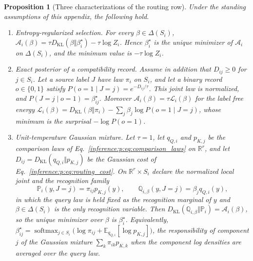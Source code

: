 \documentclass[11pt]{article}
\newtheorem{proposition}[theorem]{Proposition}
\theoremstyle{definition}
\theoremstyle{remark}
\providecommand{\KL}{D_{\mathrm{KL}}}
\providecommand{\softmax}{\operatorname{softmax}}
\providecommand{\E}{\mathbb{E}}
\providecommand{\R}{\mathbb{R}}
\begin{document}
\begin{proposition}[Three characterizations of the routing row]
\label{unified:row:prop:row}
Under the standing assumptions of this appendix, the following hold.
\begin{enumerate}
\item \emph{Entropy-regularized selection.} For every $\beta\in\Delta(S_i)$, $\mathcal A_i(\beta)=\tau\KL(\beta\Vert\beta_i^\star)-\tau\log Z_i$. Hence $\beta_i^\star$ is the unique minimizer of $\mathcal A_i$ on $\Delta(S_i)$, and the minimum value is $-\tau\log Z_i$.
\item \emph{Exact posterior of a compatibility record.} Assume in addition that $D_{ij}\ge0$ for $j\in S_i$. Let a source label $J$ have law $\pi_i$ on $S_i$, and let a binary record $o\in\{0,1\}$ satisfy $P(o=1\mid J=j)=e^{-D_{ij}/\tau}$. This joint law is normalized, and $P(J=j\mid o=1)=\beta_{ij}^\star$. Moreover $\mathcal A_i(\beta)=\tau\mathcal L_i(\beta)$ for the label free energy $\mathcal L_i(\beta)=\KL(\beta\Vert\pi_i)-\sum_j\beta_j\log P(o=1\mid J=j)$, whose minimum is the surprisal $-\log P(o=1)$.
\item \emph{Unit-temperature Gaussian mixture.} Let $\tau=1$, let $q_{Q,i}$ and $p_{K,j}$ be the comparison laws of Eq.~\eqref{inference:p:eq:comparison_laws} on $\R^r$, and let $D_{ij}=\KL(q_{Q,i}\Vert p_{K,j})$ be the Gaussian cost of Eq.~\eqref{inference:p:eq:routing_cost}. On $\R^r\times S_i$ declare the normalized local joint and the recognition family
\begin{equation}
\mathbb P_i(y,J=j)=\pi_{ij}p_{K,j}(y),\qquad \mathbb Q_{i,\beta}(y,J=j)=\beta_jq_{Q,i}(y),
\label{unified:row:eq:mixture}
\end{equation}
in which the query law is held fixed as the recognition marginal of $y$ and $\beta\in\Delta(S_i)$ is the only recognition variable. Then $\KL(\mathbb Q_{i,\beta}\Vert\mathbb P_i)=\mathcal A_i(\beta)$, so the unique minimizer over $\beta$ is $\beta_i^\star$. Equivalently, $\beta_{ij}^\star=\softmax_{j\in S_i}\bigl(\log\pi_{ij}+\E_{q_{Q,i}}[\log p_{K,j}]\bigr)$, the responsibility of component $j$ of the Gaussian mixture $\sum_k\pi_{ik}p_{K,k}$ when the component log densities are averaged over the query law.
\end{enumerate}
\end{proposition}
\end{document}
